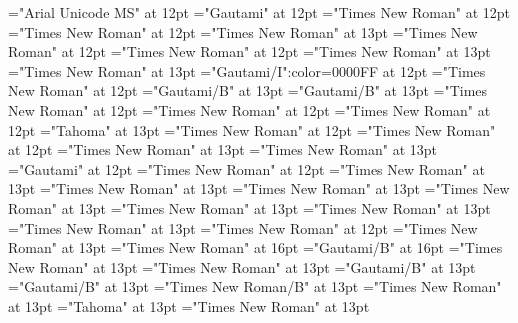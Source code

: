 \documentclass[a4paper,twoside]{article}
\begin{document}
 
\pagestyle{plain} 
\font\xitemhi="Arial Unicode MS" at 12pt
\font\xitemte="Gautami" at 12pt
\font\xitemxitemCmPossibilitypublishStemTransTypeAbbreviationPubbefore="Times New Roman" at 12pt
\font\xitemxitemcomplexformrefsbefore="Times New Roman" at 12pt
\font\xitemxitemdefinitionbefore="Times New Roman" at 13pt
\font\xitemxitemdefinitionLcbefore="Times New Roman" at 12pt
\font\xitemxitemdefinitionLdbefore="Times New Roman" at 12pt
\font\xitemxitementryrefcomponentbefore="Times New Roman" at 13pt
\font\xitemxitementryreftypebefore="Times New Roman" at 13pt
\font\xitemxitemexamplebefore="Gautami/I":color=0000FF at 12pt
\font\xitemxitemexamplesbefore="Times New Roman" at 12pt
\font\xitemxitemheadwordbefore="Gautami/B" at 13pt
\font\xitemxitemLexEntrypublishStemComponentTargetHeadWordRefbefore="Gautami/B" at 13pt
\font\xitemxitemLexSensepublishStemDefinitionPubbefore="Times New Roman" at 12pt
\font\xitemxitemLexSensepublishStemDefinitionPubLdbefore="Times New Roman" at 12pt
\font\xitemxitemprimaryrefsbefore="Times New Roman" at 12pt
\font\xitemxitempronunciationbefore="Tahoma" at 13pt
\font\xitemxitempronunciationsbefore="Times New Roman" at 12pt
\font\xitemxitemsemanticdomainsbefore="Times New Roman" at 12pt
\font\sensesensesensesbefore="Times New Roman" at 13pt
\font\xitemxitemtranslationbefore="Times New Roman" at 13pt
\font\xitemxitemtranslationLdbefore="Gautami" at 12pt
\font\xitemtpi="Times New Roman" at 12pt
\font\xitemxitemcrossrefbefore="Times New Roman" at 13pt
\font\xitemxitemcrossreftargetsbefore="Times New Roman" at 13pt
\font\xitemxitemcrossreftypebefore="Times New Roman" at 13pt
\font\xitemxitemheadwordminorbefore="Times New Roman" at 13pt
\font\xitemxitemmainentryrefbefore="Times New Roman" at 13pt
\font\xitemxitemmainentryrefminorbefore="Times New Roman" at 13pt
\font\xitemxitempronunciationminorbefore="Times New Roman" at 13pt
\font\xitemxitemsensecrossrefbefore="Times New Roman" at 12pt
\font\xitemxitemsensemainentryrefbefore="Times New Roman" at 13pt
\font{}="Times New Roman" at 16pt
\font{}="Gautami/B" at 16pt
\font{}="Times New Roman" at 13pt
\font\entryletDatadicBody="Times New Roman" at 13pt
\font\headwordggoTeluINentryletDatadicBody="Gautami/B" at 13pt
\font\headwordafterentryletDatadicBody="Gautami/B" at 13pt
\font\spanenheadwordggoTeluINentryletDatadicBody="Times New Roman/B" at 13pt
\font\spanentryletDatadicBody="Times New Roman" at 13pt
\font\pronunciationggofonipaxemicspanentryletDatadicBody="Tahoma" at 13pt
\font\spanenpronunciationggofonipaxemicspanentryletDatadicBody="Times New Roman" at 13pt
\end{document}
